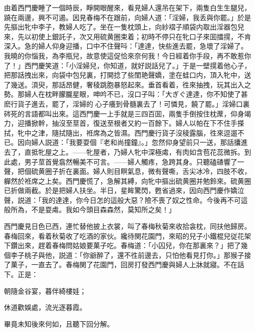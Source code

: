由着西門慶睡了一個時辰，睜開眼醒來，看見婦人還吊在架下，兩隻白生生腿兒，蹺在兩邊，興不可遏。因見春梅不在跟前，向婦人道：「淫婦，我丢與你罷。」於是先摳出牝中李子，教婦人吃了。坐在一隻枕頭上，向紗褶子順袋内取出淫器包兒來，先以初使上銀託子，次又用硫黄圈束着；初時不停只在牝口子來囬擂㨪，不肯深入。急的婦人仰身迎播，口中不住聲呌：「達達，快些進去罷，急壞了淫婦了。我曉的你惱我，為李瓶兒，故意使這促恰來奈何我！今日經着你手段，再不敢惹你了！」西門慶笑道：「小淫婦兒，你知道，就好説話兒了。」于是一壁㨪着他心子，把那話拽出來，向袋中包兒裏，打開捻了些閨艳聲嬌，塗在蛙口内，頂入牝中，送了幾送。湏臾，那話昂健，奢稜跳胞暴怒起來。垂首看着，徃來抽拽，玩其出入之勢。那婦人在枕畔朦朧星眼，呻吟不已，沒口子叫：「大ぎぐ達達，你不知使了甚麽行貨子進去，罷了，淫婦的𣭈心子癢到骨髓裏去了！可憐見，饒了罷。」淫婦口裏硶死的言語都叫出來。這西門慶一上手就是三四百囬，兩隻手倒按住枕蓆，仰身竭力，迎播掀幹，抽沒至莖首，復送至根者又約一百餘下。婦人以帕在下不住手搽拭，牝中之津，隨拭隨出，袵席為之皆濕。西門慶行貨子沒稜露腦，徃來逗遛不已。因向婦人説道：「我要耍個『老和尚撞鐘』。」忽然仰身望前只一送，那話攮進去了，直抵牝屋之上。——牝屋者，乃婦人牝中深極䖏，有肉如含苞花蕊微拆。到此處，男子莖首覺翕然暢美不可言。——婦人觸疼，急跨其身。只聽磕碴響了一聲，把個硫黄圈子折在裏面。婦人則目瞑氣息，微有聲嘶，舌尖冰冷，四肢不收，軃然於袵席之上矣。西門慶慌了，急解其縛，向牝中摳出硫黄圈并勉鈴來。硫黄圈已折做兩截。於是把婦人扶坐。半日，星眸驚閃，甦省過來，因向西門慶作嬌泣聲，説道：「我的達達，你今日怎的這般大惡？險不喪了奴之性命。今後再不可這般所為，不是耍䖏。我如今頭目森森然，莫知所之矣！」

西門慶見日色已西，連忙替他披上衣裳，叫了春梅秋菊來收拾衾枕，同扶他歸房。春梅回來，看着秋菊收了吃酒的家伙。纔待関花園門，來昭的兒子小鐵棍兒従花架下鑽出來，趕着春梅問姑娘要菓子吃。春梅道：「小囚兒，你在那裏來？」把了幾個李子桃子與他，説道：「你爺醉了，還不徃前邊去，只怕他看見打你。」那猴子接了菓子，一直去了。春梅関了花園門，回房打發西門慶與婦人上牀就寢。不在話下。正是：

\begin{myquote}
朝隨金谷宴，暮伴綺樓娃；

休道歡娛處，流光逐暮霞。
\end{myquote}

畢竟未知後來何如，且聽下回分解。


